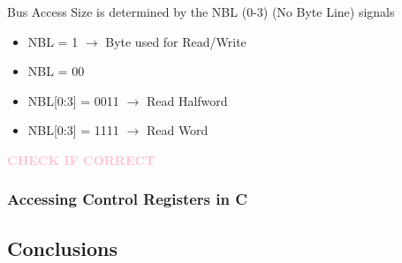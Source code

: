 \begin{theorem}{Bus Access Size}
    is determined by the NBL (0-3) (No Byte Line) signals
    \begin{itemize}
        \item NBL = 1 $\rightarrow$ Byte used for Read/Write
        \item NBL = 00
        \item NBL[0:3] = 0011 $\rightarrow$ Read Halfword
        \item NBL[0:3] = 1111 $\rightarrow$ Read Word
    \end{itemize}
    \textcolor{pink}{\textbf{CHECK IF CORRECT}}
\end{theorem}

\subsubsection{Accessing Control Registers in C}


\subsection{Conclusions}
\multend












